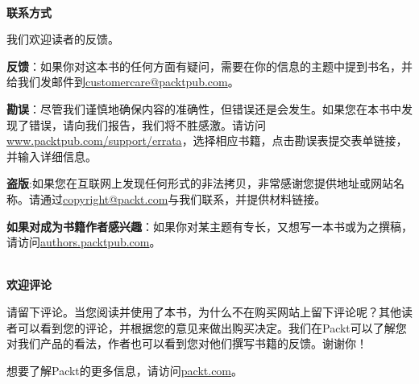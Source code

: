 \hspace*{\fill} \\ %
\textbf{联系方式}

我们欢迎读者的反馈。

\textbf{反馈}：如果你对这本书的任何方面有疑问，需要在你的信息的主题中提到书名，并给我们发邮件到\url{customercare@packtpub.com}。

\textbf{勘误}：尽管我们谨慎地确保内容的准确性，但错误还是会发生。如果您在本书中发现了错误，请向我们报告，我们将不胜感激。请访问\url{www.packtpub.com/support/errata}，选择相应书籍，点击勘误表提交表单链接，并输入详细信息。

\textbf{盗版}:如果您在互联网上发现任何形式的非法拷贝，非常感谢您提供地址或网站名称。请通过\url{copyright@packt.com}与我们联系，并提供材料链接。

\textbf{如果对成为书籍作者感兴趣}：如果你对某主题有专长，又想写一本书或为之撰稿，请访问\url{authors.packtpub.com}。

\hspace*{\fill} \\ %
\textbf{欢迎评论}

请留下评论。当您阅读并使用了本书，为什么不在购买网站上留下评论呢？其他读者可以看到您的评论，并根据您的意见来做出购买决定。我们在Packt可以了解您对我们产品的看法，作者也可以看到您对他们撰写书籍的反馈。谢谢你！

想要了解Packt的更多信息，请访问\url{packt.com}。










